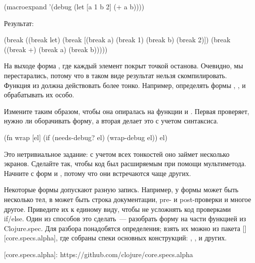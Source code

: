 \begin{english}
  \begin{clojure}
(macroexpand
 '(debug
   (let [a 1 b 2]
     (+ a b))))
  \end{clojure}
\end{english}

Результат:

\begin{english}
  \begin{clojure}
(break
 ((break let)
  (break [(break a) (break 1)
          (break b) (break 2)])
  (break ((break +) (break a) (break b)))))
  \end{clojure}
\end{english}

На выходе форма , где каждый элемент покрыт точкой останова. Очевидно, мы перестарались, потому что в таком виде результат нельзя скомпилировать. Функция  из  должна действовать более тонко. Например, определять формы , ,  и обрабатывать их особо.

Измените  таким образом, чтобы она опиралась на функции  и . Первая проверяет, нужно ли оборачивать форму, а вторая делает это с учетом синтаксиса.

\begin{english}
  \begin{clojure}
(fn wrap [el]
  (if (needs-debug? el)
    (wrap-debug el))
  el)
  \end{clojure}
\end{english}

Это нетривиальное задание: с учетом всех тонкостей оно займет несколько экранов. Сделайте так, чтобы код был расширяемым при помощи мультиметода. Начните с форм  и , потому что они встречаются чаще других.

Некоторые формы допускают разную запись. Например, у формы  может быть несколько тел, в  может быть строка документации, pre- и post-проверки и многое другое. Приведите их к единому виду, чтобы не усложнять код проверками if/else. Один из способов это сделать~--- разобрать форму на части функцией  из Clojure.spec. Для разбора понадобятся определения; взять их можно из пакета [][core.specs.alpha], где собраны спеки основных конструкций: , ,  и других.

[core.specs.alpha]: https://github.com/clojure/core.specs.alpha

